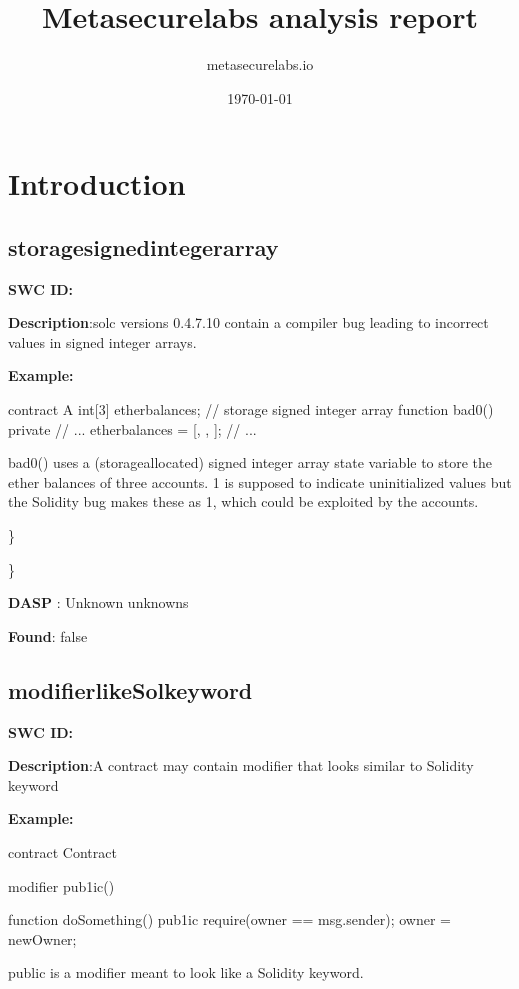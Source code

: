 \documentclass{article}
\title{Metasecurelabs analysis report}
\author{metasecurelabs.io }
\date{\today}
\begin{document}
 

\maketitle 

\section{Introduction} 
\subsection{storage\textunderscore signed\textunderscore integer\textunderscore array} 
\textbf{SWC \textunderscore ID:} 

\textbf{Description}:solc versions 0.4.7.10 contain a compiler bug leading to incorrect values in signed integer arrays.


\textbf{Example:} 

contract A {
  int[3] ether\textunderscore balances; // storage signed integer array
  function bad0() private {
    // ...
    ether\textunderscore balances = [, , ];
    // ...
  }
}

bad0() uses a (storage\textendash allocated) signed integer array state variable to store the ether balances of three accounts. 1 is supposed to indicate uninitialized values but the Solidity bug makes these as 1, which could be exploited by the accounts.

\} 

\} 

\textbf{DASP} : Unknown unknowns

\textbf{Found}: false

\subsection{modifier\textunderscore like\textunderscore Sol\textunderscore keyword} 
\textbf{SWC \textunderscore ID:} 

\textbf{Description}:A contract may contain modifier that looks similar to Solidity keyword


\textbf{Example:} 

contract Contract{
    modifier pub1ic() {
    }

    function doSomething() pub1ic {
        require(owner == msg.sender);
        owner = newOwner;
    }
}

public is a modifier meant to look like a Solidity keyword.
\end{document}
